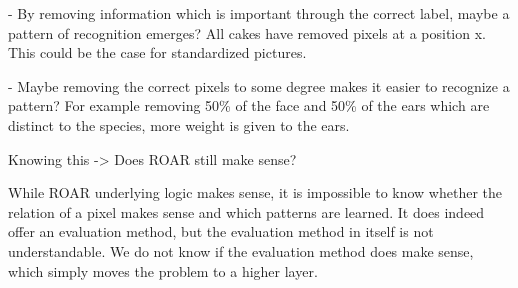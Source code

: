 - By removing information which is important through the correct label, maybe a pattern of recognition emerges?
All cakes have removed pixels at a position x. This could be the case for standardized pictures.

- Maybe removing the correct pixels to some degree makes it easier to recognize a pattern? For example removing 50\% of the face and 50\% of the ears which are distinct to the species, more weight is given to the ears.



Knowing this -> Does ROAR still make sense?

While ROAR underlying logic makes sense, it is impossible to know whether the relation of a pixel makes sense and which patterns are learned. It does indeed offer an evaluation method, but the evaluation method in itself is not understandable. We do not know if the evaluation method does make sense, which simply moves the problem to a higher layer.






